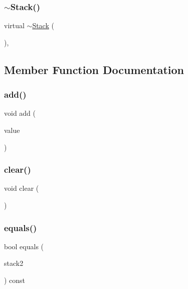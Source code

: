 \mbox{\label{classStack_aa757fa42027d1b9690c567ff38c65708}} 
\subsubsection{\texorpdfstring{$\sim$\+Stack()}{~Stack()}}
{\footnotesize\ttfamily virtual $\sim$\mbox{\hyperlink{classStack}{Stack}} (\begin{DoxyParamCaption}{ }\end{DoxyParamCaption})\hspace{0.3cm}{\ttfamily [virtual]}, {\ttfamily [default]}}



\subsection{Member Function Documentation}
\mbox{\label{classStack_ab901606bf3a8019c986f0cf9a9f298dc}} 
\subsubsection{\texorpdfstring{add()}{add()}}
{\footnotesize\ttfamily void add (\begin{DoxyParamCaption}\item[{const Value\+Type \&}]{value }\end{DoxyParamCaption})}

\mbox{\label{classStack_ac8bb3912a3ce86b15842e79d0b421204}} 
\subsubsection{\texorpdfstring{clear()}{clear()}}
{\footnotesize\ttfamily void clear (\begin{DoxyParamCaption}{ }\end{DoxyParamCaption})}

\mbox{\label{classStack_a8a06f9a4f35024fe7f29b0f87dd9a711}} 
\subsubsection{\texorpdfstring{equals()}{equals()}}
{\footnotesize\ttfamily bool equals (\begin{DoxyParamCaption}\item[{const \mbox{\hyperlink{classStack}{Stack}}$<$ Value\+Type $>$ \&}]{stack2 }\end{DoxyParamCaption}) const}

